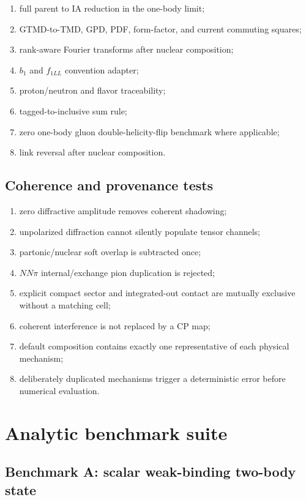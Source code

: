 \documentclass[11pt]{article}
\begin{document}
\begin{enumerate}
\item full parent to IA reduction in the one-body limit;
\item GTMD-to-TMD, GPD, PDF, form-factor, and current commuting squares;
\item rank-aware Fourier transforms after nuclear composition;
\item \(b_1\) and \(f_{1LL}\) convention adapter;
\item proton/neutron and flavor traceability;
\item tagged-to-inclusive sum rule;
\item zero one-body gluon double-helicity-flip benchmark where applicable;
\item link reversal after nuclear composition.
\end{enumerate}

\subsection{Coherence and provenance tests}

\begin{enumerate}
\item zero diffractive amplitude removes coherent shadowing;
\item unpolarized diffraction cannot silently populate tensor channels;
\item partonic/nuclear soft overlap is subtracted once;
\item \(NN\pi\) internal/exchange pion duplication is rejected;
\item explicit compact sector and integrated-out contact are mutually
      exclusive without a matching cell;
\item coherent interference is not replaced by a CP map;
\item default composition contains exactly one representative of each
      physical mechanism;
\item deliberately duplicated mechanisms trigger a deterministic error
      before numerical evaluation.
\end{enumerate}

\section{Analytic benchmark suite}
\label{sec:benchmarks}

\subsection{Benchmark A: scalar weak-binding two-body state}
\end{document}
